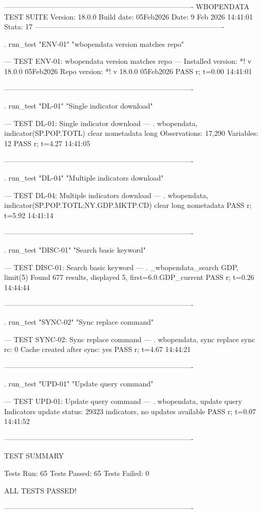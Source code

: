 -------------------------------------------------------------------------------
WBOPENDATA TEST SUITE
Version: 18.0.0
Build date: 05Feb2026
Date:  9 Feb 2026 14:41:01
Stata: 17
-------------------------------------------------------------------------------

. run_test "ENV-01" "wbopendata version matches repo"

--- TEST ENV-01: wbopendata version matches repo ---
Installed version: *! v 18.0.0  05Feb2026
Repo version:      *! v 18.0.0  05Feb2026
PASS
r; t=0.00 14:41:01

-------------------------------------------------------------------------------

. run_test "DL-01" "Single indicator download"

--- TEST DL-01: Single indicator download ---
. wbopendata, indicator(SP.POP.TOTL) clear nometadata long
Observations: 17,290
Variables:    12
PASS
r; t=4.27 14:41:05

-------------------------------------------------------------------------------

. run_test "DL-04" "Multiple indicators download"

--- TEST DL-04: Multiple indicators download ---
. wbopendata, indicator(SP.POP.TOTL;NY.GDP.MKTP.CD) clear long nometadata
PASS
r; t=5.92 14:41:14

-------------------------------------------------------------------------------

. run_test "DISC-01" "Search basic keyword"

--- TEST DISC-01: Search basic keyword ---
. _wbopendata_search GDP, limit(5)
Found 677 results, displayed 5, first=6.0.GDP_current
PASS
r; t=0.26 14:44:44

-------------------------------------------------------------------------------

. run_test "SYNC-02" "Sync replace command"

--- TEST SYNC-02: Sync replace command ---
. wbopendata, sync replace
sync rc: 0
Cache created after sync: yes
PASS
r; t=4.67 14:44:21

-------------------------------------------------------------------------------

. run_test "UPD-01" "Update query command"

--- TEST UPD-01: Update query command ---
. wbopendata, update query
Indicators update status: 29323 indicators, no updates available
PASS
r; t=0.07 14:41:52

-------------------------------------------------------------------------------

TEST SUMMARY

Tests Run:    65
Tests Passed: 65
Tests Failed: 0

ALL TESTS PASSED!

-------------------------------------------------------------------------------
